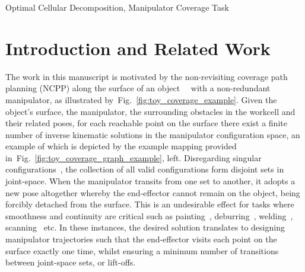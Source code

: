 \documentclass[journal]{IEEEtran}
\begin{document}
\begin{IEEEkeywords}
Optimal Cellular Decomposition, Manipulator Coverage Task
\end{IEEEkeywords}

\IEEEpeerreviewmaketitle

\section{Introduction and Related Work}
\label{section_introduction}
The work in this manuscript is motivated by the non-revisiting coverage path planning (NCPP) along the surface of an object~\cite{Paul2013Novel}~\cite{Bhatt2019Concurrent} with a non-redundant manipulator, as illustrated by~Fig.~\ref{fig:toy_coverage_example}. 
Given the object's surface, the manipulator, 
the surrounding obstacles in the workcell and their related poses, for each reachable point on the surface there exist a finite number of inverse kinematic solutions in the manipulator configuration space, an example of which is depicted by the example mapping provided in~Fig.~\ref{fig:toy_coverage_graph_example}, left. 
Disregarding singular configurations~\cite{Yoshikawa1990Translational}, the collection of all valid configurations form disjoint sets in joint-space. When the manipulator transits from one set to another, it adopts a new pose altogether whereby the end-effector cannot remain on the object, being forcibly detached from the surface. This is an undesirable effect for tasks where smoothness and continuity are critical such as painting~\cite{li2011painting}, deburring~\cite{xie2016grinding}, welding~\cite{lee2011optimal}, scanning~\cite{Giataganas2013Cooperative} etc. 
In these instances, the desired solution translates to designing manipulator trajectories such that the end-effector visits each point on the surface exactly one time, whilst ensuring a minimum number of transitions between joint-space sets, or lift-offs. 
\end{document}

